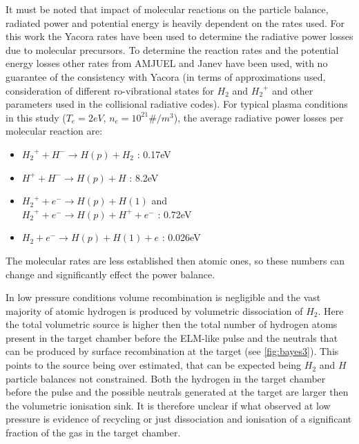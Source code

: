 It must be noted that impact of molecular reactions on the particle balance, radiated power and potential energy is heavily dependent on the rates used. For this work the Yacora rates have been used to determine the radiative power losses due to molecular precursors. To determine the reaction rates and the potential energy losses other rates from AMJUEL and Janev have been used, with no guarantee of the consistency with Yacora (in terms of approximations used, consideration of different ro-vibrational states for $H_2$ and ${H_2}^+$ and other parameters used in the collisional radiative codes). For typical plasma conditions in this study ($T_e=2eV$, $n_e=10^{21}\#/m^3$), the average radiative power losses per molecular reaction are:
\begin{itemize}
    \item ${H_2}^+ + H^- \rightarrow H(p) + H_2$ : 0.17eV
    \item $H^+ + H^- \rightarrow H(p) + H$ : 8.2eV
    \item ${H_2}^+ + e^- \rightarrow H(p) + H(1)$ and \\ ${H_2}^+ + e^- \rightarrow H(p) + H^+ + e^-$ : 0.72eV
    \item $H_2 + e^- \rightarrow H(p) + H(1) + e$ : 0.026eV
\end{itemize}
The molecular rates are less established then atomic ones, so these numbers can change and significantly effect the power balance.



In low pressure conditions volume recombination is negligible and the vast majority of atomic hydrogen is produced by volumetric dissociation of $H_2$. Here the total volumetric source is higher then the total number of hydrogen atoms present in the target chamber before the ELM-like pulse and the neutrals that can be produced by surface recombination at the target (see \autoref{fig:bayes3}). This points to the source being over estimated, that can be expected being $H_2$ and $H$ particle balances not constrained. Both the hydrogen in the target chamber before the pulse and the possible neutrals generated at the target are larger then the volumetric ionisation sink. It is therefore unclear if what observed at low pressure is evidence of recycling or just dissociation and ionisation of a significant fraction of the gas in the target chamber.

